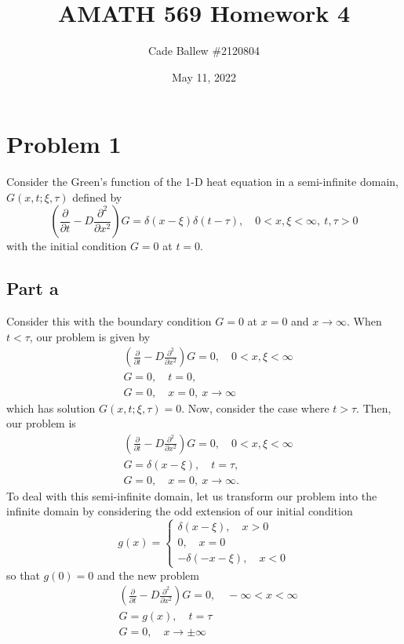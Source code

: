 \documentclass{article}
\title{AMATH 569 Homework 4}
\author{Cade Ballew \#2120804}
\date{May 11, 2022}
\begin{document}
	
\maketitle
	
\section{Problem 1}
Consider the Green's function of the 1-D heat equation in a semi-infinite domain, $G(x,t;\xi,\tau)$ defined by 
\[
\left(\frac{\partial}{\partial t}-D\frac{\partial^2}{\partial x^2}\right)G=\delta(x-\xi)\delta(t-\tau), \quad 0<x,\xi<\infty, ~t,\tau>0
\]
with the initial condition $G=0$ at $t=0$.

\subsection{Part a}
Consider this with the boundary condition $G=0$ at $x=0$ and $x\to\infty$. When $t<\tau$, our problem is given by
\begin{align*}
&\left(\frac{\partial}{\partial t}-D\frac{\partial^2}{\partial x^2}\right)G=0, \quad 0<x,\xi<\infty\\
&G=0, \quad t=0,\\
&G=0, \quad x=0,~x\to\infty
\end{align*}
which has solution $G(x,t;\xi,\tau)=0$. Now, consider the case where $t>\tau$. Then, our problem is
\begin{align*}
	&\left(\frac{\partial}{\partial t}-D\frac{\partial^2}{\partial x^2}\right)G=0, \quad 0<x,\xi<\infty\\
	&G=\delta(x-\xi), \quad t=\tau,\\
	&G=0, \quad x=0,~x\to\infty.
\end{align*}
To deal with this semi-infinite domain, let us transform our problem into the infinite domain by considering the odd extension of our initial condition 
\[
g(x)=\begin{cases}
	\delta(x-\xi), \quad x>0\\
	0, \quad x=0\\
	-\delta(-x-\xi), \quad x<0
\end{cases}
\]
so that $g(0)=0$ and the new problem
\begin{align*}
	&\left(\frac{\partial}{\partial t}-D\frac{\partial^2}{\partial x^2}\right)G=0, \quad -\infty<x<\infty\\
	&G=g(x), \quad t=\tau\\
	&G=0, \quad x\to\pm\infty
\end{align*}
\end{document}
